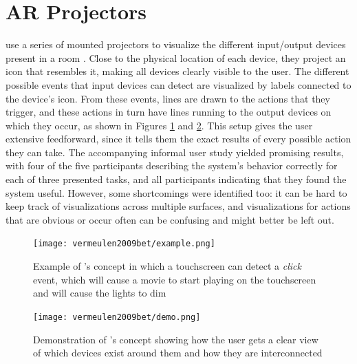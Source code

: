 \section{AR Projectors} \label{sec:relat:ar_projectors}
\textbf{\citeauthor{vermeulen2009bet}} use a series of mounted projectors to visualize the different input/output devices present in a room \cite{vermeulen2009bet}. Close to the physical location of each device, they project an icon that resembles it, making all devices clearly visible to the user. The different possible events that input devices can detect are visualized by labels connected to the device's icon. From these events, lines are drawn to the actions that they trigger, and these actions in turn have lines running to the output devices on which they occur, as shown in Figures \ref{fig:vermeulen2009bet_mockup} and \ref{fig:vermeulen2009bet_demo}. This setup gives the user extensive feedforward, since it tells them the exact results of every possible action they can take. The accompanying informal user study yielded promising results, with four of the five participants describing the system's behavior correctly for each of three presented tasks, and all participants indicating that they found the system useful. However, some shortcomings were identified too: it can be hard to keep track of visualizations across multiple surfaces, and visualizations for actions that are obvious or occur often can be confusing and might better be left out.

\begin{figure}
    \centering
    \texttt{[image: vermeulen2009bet/example.png]}
    \caption{Example of \textbf{\citeauthor{vermeulen2009bet}}'s concept in which a touchscreen can detect a \textit{click} event, which will cause a movie to start playing on the touchscreen and will cause the lights to dim \cite{vermeulen2009bet}}
    \label{fig:vermeulen2009bet_mockup}
\end{figure}

\begin{figure}
    \centering
    \texttt{[image: vermeulen2009bet/demo.png]}
    \caption{Demonstration of \textbf{\citeauthor{vermeulen2009bet}}'s concept showing how the user gets a clear view of which devices exist around them and how they are interconnected \cite{vermeulen2009bet}}
    \label{fig:vermeulen2009bet_demo}
\end{figure}

